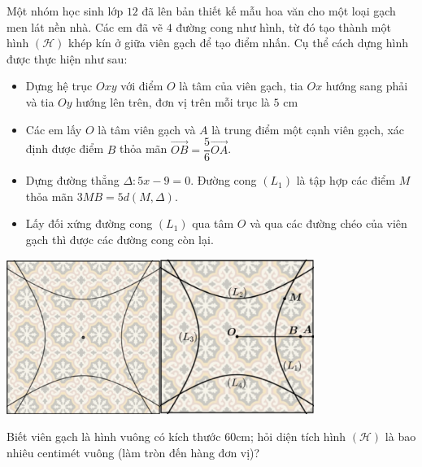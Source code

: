 \begin{ex}%
Một nhóm học sinh lớp $12$ đã lên bản thiết kế mẫu hoa văn cho một loại gạch men lát nền nhà. Các em đã vẽ $4$ đường cong như hình, từ đó tạo thành một hình $(\mathscr{H})$ khép kín ở giữa viên gạch để tạo điểm nhấn. Cụ thể cách dựng hình được thực hiện như sau:
\begin{itemize}
    \item Dựng hệ trục $Oxy$ với điểm $O$ là tâm của viên gạch, tia $Ox$ hướng sang phải và tia $Oy$ hướng lên trên, đơn vị trên mỗi trục là $5$ cm
    \item Các em lấy $O$ là tâm viên gạch và $A$ là trung điểm một cạnh viên gạch, xác định được điểm $B$ thỏa mãn $\overrightarrow{OB}=\dfrac{5}{6}\overrightarrow{OA}$.
    \item Dựng đường thẳng $\Delta \colon 5x-9=0$. Đường cong $\left(L_1\right)$ là tập hợp các điểm $M$ thỏa mãn $3MB=5d\left(M,\Delta\right)$.
    \item Lấy đối xứng đường cong $\left(L_1\right)$ qua tâm $O$ và qua các đường chéo của viên gạch thì được các đường cong còn lại.
\end{itemize}
\begin{center}
    \includegraphics[width=5cm]{img/HXN-2-20-a}\qquad  \includegraphics[width=5cm]{img/HXN-2-20-b}
\end{center}
Biết viên gạch là hình vuông có kích thước $60$cm; hỏi diện tích hình $(\mathscr{H})$ là bao nhiêu centimét vuông (làm tròn đến hàng đơn vị)?
\end{ex}
